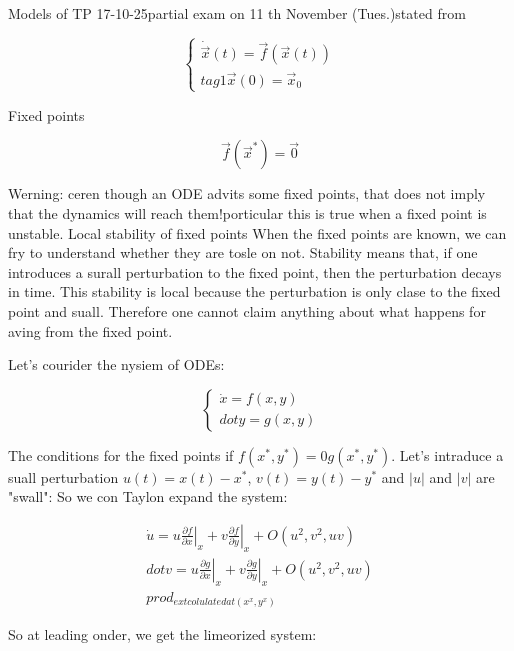 Models of TP 17-10-25\nFirst partial exam on 11 th November (Tues.)\nWe stated from

\[
\left\{\begin{array}{l}
\dot{\vec{x}}(t)=\vec{f}(\vec{x}(t))  \\tag{1}
\vec{x}(0)=\vec{x}_{0}
\end{array}
\right.
\]

Fixed points


\begin{equation*}
\vec{f}\left(\vec{x}^{*}\right)=\overrightarrow{0} \tag{3}
\end{equation*}


Werning: ceren though an ODE advits some fixed points, that does not imply that the dynamics will reach them!\nIn porticular this is true when a fixed point is unstable.
Local stability of fixed points
When the fixed points are known, we can fry to understand whether they are tosle on not. Stability means that, if one introduces a surall perturbation to the fixed point, then the perturbation decays in time. This stability is local because the perturbation is only clase to the fixed point and suall. Therefore one cannot claim anything about what happens for aving from the fixed point.

Let's courider the nysiem of ODEs:

$$\
\left\{\begin{array}{l}
\dot{x}=f(x, y) \\dot{y}=g(x, y)
\end{array}
\right.
$$

The conditions for the fixed points if $f\left(x^{*}, y^{*}\right)=0 g\left(x^{*}, y^{*}\right)$. Let's intraduce a suall perturbation $u(t)=x(t)-x^{*}$, $v(t)=y(t)-y^{*}$ and $|u|$ and $|v|$ are "swall": So we con Taylon expand the system:

$$
\begin{gathered}
\dot{u}=\left.u \frac{\partial f}{\partial x}\right|_{x}+\left.v \frac{\partial f}{\partial y}\right|_{x}+O\left(u^{2}, v^{2}, u v\right) \\dot{v}=\left.u \frac{\partial g}{\partial x}\right|_{x}+\left.v \frac{\partial g}{\partial y}\right|_{x}+O\left(u^{2}, v^{2}, u v\right) \\prod_{	ext {colulated at }\left(x^{x}, y^{x}\right)}
\end{gathered}
$$

So at leading onder, we get the limeorized system:

